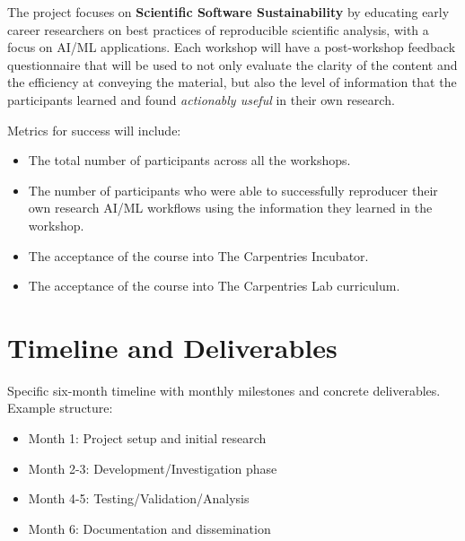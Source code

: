 \documentclass[letterpaper, 11pt]{article}
\begin{document}

The project focuses on \textbf{Scientific Software Sustainability} by educating early career researchers on best practices of reproducible scientific analysis, with a focus on AI/ML applications.
Each workshop will have a post-workshop feedback questionnaire that will be used to not only evaluate the clarity of the content and the efficiency at conveying the material, but also the level of information that the participants learned and found \emph{actionably useful} in their own research.

Metrics for success will include:
\begin{itemize}
  \item The total number of participants across all the workshops.
  \item The number of participants who were able to successfully reproducer their own research AI/ML workflows using the information they learned in the workshop.
  \item The acceptance of the course into The Carpentries Incubator.
  \item The acceptance of the course into The Carpentries Lab curriculum.
\end{itemize}

\section{Timeline and Deliverables}

Specific six-month timeline with monthly milestones and concrete deliverables.
Example structure:

\begin{itemize}
  \item Month 1: Project setup and initial research
  \item Month 2-3: Development/Investigation phase
  \item Month 4-5: Testing/Validation/Analysis
  \item Month 6: Documentation and dissemination
\end{itemize}

%
\vspace*{-0.25cm}
\begin{footnotesize}
%
 
 
%
\end{footnotesize}
\end{document}
